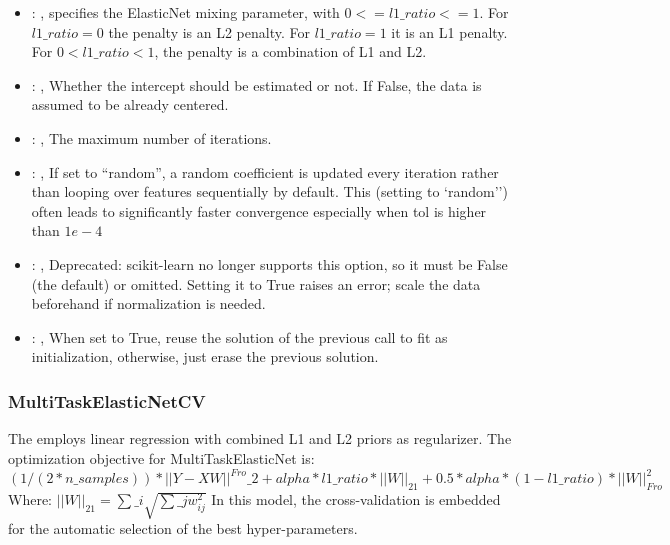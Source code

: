 \begin{itemize}
    \item {}: ,
      specifies the                                                  ElasticNet mixing parameter,
      with $0 <= l1\_ratio <= 1$.                                                  For $l1\_ratio =
      0$ the penalty is an L2 penalty.                                                  For
      $l1\_ratio = 1$ it is an L1 penalty.                                                  For $0 <
      l1\_ratio < 1$, the penalty is a combination of L1 and L2.

    \item {}: ,
      Whether the intercept should be estimated or not. If False,
      the data is assumed to be already centered.

    \item {}: ,
      The maximum number of iterations.

    \item {}: ,
      If set to ``random'', a random coefficient is updated every iteration
      rather than looping over features sequentially by default. This (setting to `random'')
      often leads to significantly faster convergence especially when tol is higher than $1e-4$

    \item {}: ,
      Deprecated: scikit-learn no longer supports this option, so it must be False (the default) or
      omitted.                                                  Setting it to True raises an error;
      scale the data beforehand if normalization is needed.

    \item {}: ,
      When set to True, reuse the solution of the previous call
      to fit as initialization, otherwise, just erase the previous solution.
  \end{itemize}


\subsubsection{MultiTaskElasticNetCV}
  The  employs                         linear regression with
  combined L1 and L2 priors as regularizer.                         The optimization objective for
  MultiTaskElasticNet is:                         $(1 / (2 * n\_samples)) * ||Y - XW||^{Fro}\_2
  + alpha * l1\_ratio * ||W||_{21}                         + 0.5 * alpha * (1 - l1\_ratio) *
  ||W||_{Fro}^2$                         \\Where:                         $||W||_{21} = \sum\_i
  \sqrt{\sum\_j w_{ij}^2}$                         In this model, the cross-validation is embedded
  for the automatic selection                         of the best hyper-parameters.

